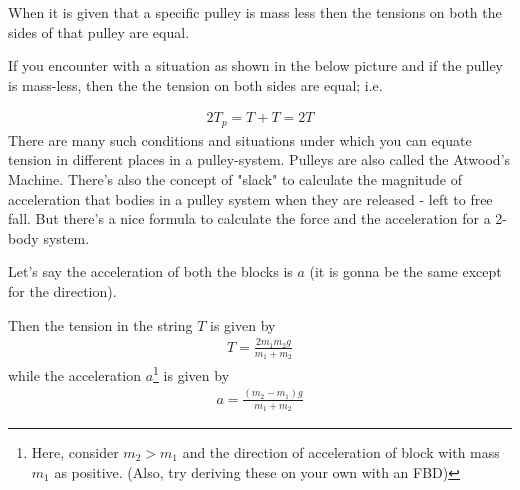 \begin{phybox}{}
{When it is given that a specific pulley is mass less then the tensions on both the sides of that pulley are equal.

If you encounter with a situation as shown in the below picture and if the pulley is mass-less, then the the tension on both sides are equal; i.e.
\begin{center}
\end{center}
\begin{align*}
    2T_p = T+T = 2T
\end{align*}
There are many such conditions and situations under which you can equate tension in different places in a pulley-system. Pulleys are also called the Atwood's Machine. There's also the concept of "slack" to calculate the magnitude of acceleration that bodies in a pulley system when they are released - left to free fall. But there's a nice formula to calculate the force and the acceleration for a 2-body system.
\begin{center}
\end{center}
Let's say the acceleration of both the blocks is $a$ (it is gonna be the same except for the direction).

Then the tension in the string $T$ is given by
\begin{align*}
    T = \frac{2m_1m_2g}{m_1+m_2}
\end{align*}
while the acceleration $a$\footnote{Here, consider $m_2 > m_1$ and the direction of acceleration of block with mass $m_1$ as positive. (Also, try deriving these on your own with an FBD)} is given by
\begin{align*}
    a = \frac{(m_2-m_1)g}{m_1+m_2}
\end{align*}}
\end{phybox}
